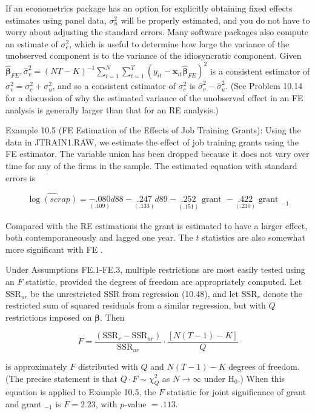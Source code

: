 \documentclass[10pt]{article}
\begin{document}
If an econometrics package has an option for explicitly obtaining fixed effects estimates using panel data, $\sigma_{u}^{2}$ will be properly estimated, and you do not have to worry about adjusting the standard errors. Many software packages also compute an estimate of $\sigma_{c}^{2}$, which is useful to determine how large the variance of the unobserved component is to the variance of the idiosyncratic component. Given $\hat{\boldsymbol{\beta}}_{F E}, \hat{\sigma}_{v}^{2}= (N T-K)^{-1} \sum_{i=1}^{N} \sum_{t=1}^{T}\left(y_{i t}-\mathbf{x}_{i t} \hat{\boldsymbol{\beta}}_{F E}\right)^{2}$ is a consistent estimator of $\sigma_{v}^{2}=\sigma_{c}^{2}+\sigma_{u}^{2}$, and so a consistent estimator of $\sigma_{c}^{2}$ is $\hat{\sigma}_{v}^{2}-\hat{\sigma}_{u}^{2}$. (See Problem 10.14 for a discussion of why the estimated variance of the unobserved effect in an FE analysis is generally larger than that for an RE analysis.)

Example 10.5 (FE Estimation of the Effects of Job Training Grants): Using the data in JTRAIN1.RAW, we estimate the effect of job training grants using the FE estimator. The variable union has been dropped because it does not vary over time for any of the firms in the sample. The estimated equation with standard errors is

$$
\widehat{\log (s c r a p)}=\underset{(.109)}{-.080} d 88-\underset{(.133)}{.247} d 89-\underset{(.151)}{.252} \text { grant }-\underset{(.210)}{.422} \text { grant }_{-1}
$$

Compared with the RE estimations the grant is estimated to have a larger effect, both contemporaneously and lagged one year. The $t$ statistics are also somewhat more significant with FE .

Under Assumptions FE.1-FE.3, multiple restrictions are most easily tested using an $F$ statistic, provided the degrees of freedom are appropriately computed. Let $\mathrm{SSR}_{u r}$ be the unrestricted SSR from regression (10.48), and let $\mathrm{SSR}_{r}$ denote the restricted sum of squared residuals from a similar regression, but with $Q$ restrictions imposed on $\boldsymbol{\beta}$. Then

$$
F=\frac{\left(\mathrm{SSR}_{r}-\mathrm{SSR}_{u r}\right)}{\mathrm{SSR}_{u r}} \cdot \frac{[N(T-1)-K]}{Q}
$$

is approximately $F$ distributed with $Q$ and $N(T-1)-K$ degrees of freedom. (The precise statement is that $Q \cdot F \sim \chi_{Q}^{2}$ as $N \rightarrow \infty$ under $\mathrm{H}_{0}$.) When this equation is applied to Example 10.5, the $F$ statistic for joint significance of grant and grant $_{-1}$ is $F=2.23$, with $p$-value $=.113$.
\end{document}
